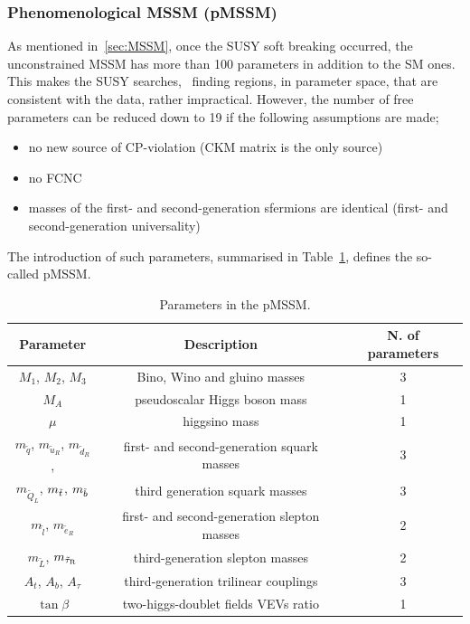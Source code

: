 			\subsubsection*{Phenomenological \ac{MSSM} (pMSSM)}

				As mentioned in~\ref{sec:MSSM}, once the \ac{SUSY} soft breaking occurred, the unconstrained \ac{MSSM} has more than 100 parameters in addition to the \ac{SM} ones. This makes the \ac{SUSY} searches, \eg\ finding regions, in parameter space, that are consistent with the data, rather impractical. However, the number of free parameters can be reduced down to 19 if the following  assumptions are made; 

				\begin{itemize}
					\item no new source of CP-violation (CKM matrix is the only source)
					\item no \ac{FCNC}
					\item masses of the first- and second-generation sfermions are identical (first- and second-generation universality)
				\end{itemize}
				
				\noindent The introduction of such parameters, summarised in Table~\ref{tab:MSSM_mainFreePar}, defines the so-called \ac{pMSSM}.
				
				\begin{table}[!htb]\centering\caption{Parameters in the pMSSM.}
					\begin{tabular}{c|c|c}
					\hline
					\textbf{Parameter} & \textbf{Description} & \textbf{N. of parameters} \\ \hline \hline

					$M_1$, $M_2$, $M_3$ & Bino, Wino and gluino masses & 3 \\ \hline

					$M_{A}$	& pseudoscalar Higgs boson mass	& 1 \\\hline
					$\mu$  & higgsino mass & 1 \\\hline

					$m_{\tilde{q}}$, $m_{\tilde{u}_R}$, $m_{\tilde{d}_R}$, & first- and second-generation squark masses & 3 \\
					$m_{\tilde{Q}_L}$, $m_{\tilde{t}}$, $m_{\tilde{b}}$ & third generation squark masses	&  3 \\\hline

					$m_{\tilde{l}}$, $m_{\tilde{e}_R}$ & first- and second-generation slepton masses	 & 2 \\
					$m_{\tilde{L}}$, $m_{\tilde{\tau}_{\mathrm{R}}}$ & third-generation slepton masses	& 2 \\\hline

					$A_t$, $A_b$, $A_{\tau}$ & third-generation trilinear couplings	& 3 \\\hline

					$\tan \beta$ & two-higgs-doublet fields \ac{VEV}s ratio & 1 \\ 
					\hline
					\end{tabular}
				\label{tab:MSSM_mainFreePar} 
				\end{table}

